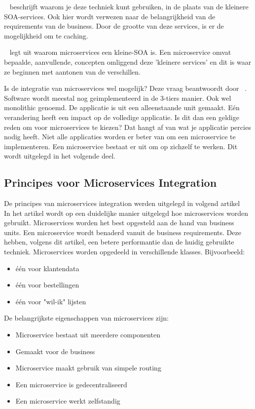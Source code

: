 ~\cite{Atrash2018} beschrijft waarom je deze techniek kunt gebruiken, in de plaats van de kleinere SOA-services. Ook hier wordt verwezen naar de belangrijkheid van de requirements van de business. Door de grootte van deze services, is er de mogelijkheid om te caching. 

~\cite{devoteam2018} legt uit waarom microservices een kleine-SOA is. Een microservice omvat bepaalde, aanvullende, concepten omliggend deze 'kleinere services' en dit is waar ze beginnen met aantonen van de verschillen.

Is de integratie van microservices wel mogelijk? Deze vraag beantwoordt door ~\cite{VanBart2018}. Software wordt meestal nog geimplementeerd in de 3-tiers manier. Ook wel monolithic genoemd. De applicatie is uit een alleenstaande unit gemaakt. Eén verandering heeft een impact op de volledige applicatie. Is dit dan een geldige reden om voor microservices te kiezen? Dat hangt af van wat je applicatie percies nodig heeft. Niet alle applicaties worden er beter van om een microservice te implementeren. Een microservice  bestaat er uit om op zichzelf te werken. Dit wordt uitgelegd in het volgende deel.

\subsection{Principes voor Microservices Integration}

De principes van microservices integration werden uitgelegd in volgend artikel ~\cite{Aradheye2018}
In het artikel wordt op een duidelijke manier uitgelegd hoe microservices worden gebruikt. Microservices worden het best opgesteld aan de hand van business units. Een microservice wordt benaderd vanuit de business requirements. Deze hebben, volgens dit artikel, een betere performantie dan de huidig gebruikte techniek. Microservices worden opgedeeld in verschillende klasses. Bijvoorbeeld:
\begin{itemize}
	\item één voor klantendata
	\item één voor bestellingen
	\item één voor "wil-ik" lijsten
\end{itemize}

De belangrijkste eigenschappen van microservices zijn:
\begin{itemize}
	\item Microservice bestaat uit meerdere componenten
	\item Gemaakt voor de business
	\item Microservice maakt gebruik van simpele routing
	\item Een microservice is gedecentraliseerd
	\item Een microservice werkt zelfstandig
\end{itemize}

